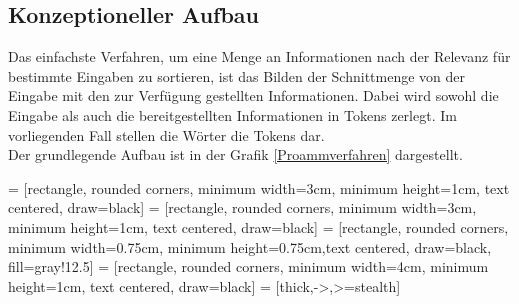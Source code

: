 \documentclass[a4paper,10pt]{article}
\begin{document}
    \subsection{Konzeptioneller Aufbau}
        Das einfachste Verfahren, um eine Menge an Informationen nach der Relevanz für bestimmte Eingaben zu sortieren, ist das Bilden der Schnittmenge von der Eingabe mit den zur Verfügung gestellten Informationen. Dabei wird sowohl die Eingabe als auch die bereitgestellten Informationen in Tokens zerlegt. Im vorliegenden Fall stellen die Wörter die Tokens dar.\\
        Der grundlegende Aufbau ist in der Grafik \ref{Proammverfahren} dargestellt.

         = [rectangle, rounded corners, minimum width=3cm, minimum height=1cm, text centered, draw=black]%
         = [rectangle, rounded corners, minimum width=3cm, minimum height=1cm, text centered, draw=black]
         = [rectangle, rounded corners, minimum width=0.75cm, minimum height=0.75cm,text centered, draw=black, fill=gray!12.5]
         = [rectangle, rounded corners, minimum width=4cm, minimum height=1cm, text centered, draw=black]
         = [thick,->,>=stealth]
\end{document}
